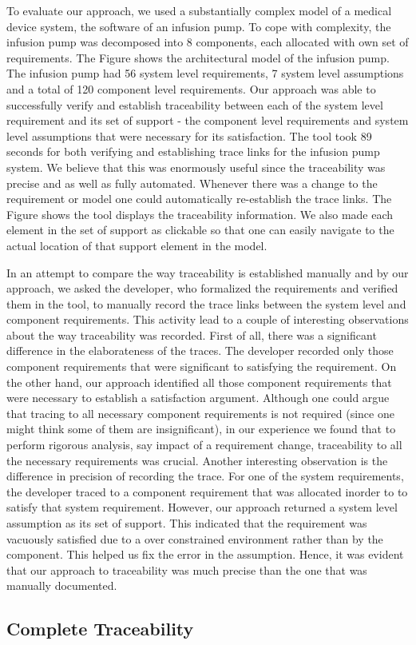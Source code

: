 To evaluate our approach, we used a substantially complex model of a medical device system, the software of an infusion pump. To cope with complexity, the infusion pump was decomposed into 8 components, each allocated with own set of requirements. The Figure shows the architectural model of the infusion pump. The infusion pump had 56 system level requirements, 7 system level assumptions and a total of 120 component level requirements. Our approach was able to successfully verify and establish traceability between each of the system level requirement and its set of support - the component level requirements and system level assumptions that were necessary for its satisfaction. The tool took 89 seconds for both verifying and establishing trace links for the infusion pump system. We believe that this was enormously useful since the traceability was precise and as well as fully automated. Whenever there was a change to the requirement or model one could automatically re-establish the trace links. The Figure shows the tool displays the traceability information. We also made each element in the set of support as clickable so that one can easily navigate to the actual location of that support element in the model.

In an attempt to compare the way traceability is established manually and by our approach, we asked the developer, who formalized the requirements and verified them in the tool, to manually record the trace links between the system level and component requirements. This activity lead to a couple of interesting observations about the way traceability was recorded. First of all, there was a significant difference in the elaborateness of the traces. The developer recorded only those component requirements that were significant to satisfying the requirement. On the other hand, our approach identified all those component requirements that were necessary to establish a satisfaction argument. Although one could argue that tracing to all necessary component requirements is not required (since one might think some of them are insignificant), in our experience we found that to perform rigorous analysis, say impact of a requirement change, traceability to all the necessary requirements was crucial. Another interesting observation is the difference in precision of recording the trace. For one of the system requirements, the developer traced to a component requirement that was allocated inorder to to satisfy that system requirement. However, our approach returned a system level assumption as its set of support. This indicated that the requirement was vacuously satisfied due to a over constrained environment rather than by the component. This helped us fix the error in the assumption. Hence, it was evident that our approach to traceability was much precise than the one that was manually documented.

\subsection{Complete Traceability}


\fi 